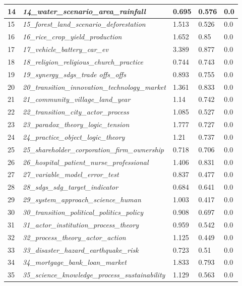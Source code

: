 \documentclass[12pt]{article}
\begin{document}
\begin{longtable}{|l|l|l|l|l|}
14 & \textit{14\_water\_scenario\_area\_rainfall} & 0.695 & 0.576 & 0.0 \\ \hline
15 & \textit{15\_forest\_land\_scenario\_deforestation} & 1.513 & 0.526 & 0.0 \\ \hline
16 & \textit{16\_rice\_crop\_yield\_production} & 1.652 & 0.85 & 0.0 \\ \hline
17 & \textit{17\_vehicle\_battery\_car\_ev} & 3.389 & 0.877 & 0.0 \\ \hline
18 & \textit{18\_religion\_religious\_church\_practice} & 0.744 & 0.743 & 0.0 \\ \hline
19 & \textit{19\_synergy\_sdgs\_trade offs\_offs} & 0.893 & 0.755 & 0.0 \\ \hline
20 & \textit{20\_transition\_innovation\_technology\_market} & 1.361 & 0.833 & 0.0 \\ \hline
21 & \textit{21\_community\_village\_land\_year} & 1.14 & 0.742 & 0.0 \\ \hline
22 & \textit{22\_transition\_city\_actor\_process} & 1.085 & 0.527 & 0.0 \\ \hline
23 & \textit{23\_paradox\_theory\_logic\_tension} & 1.777 & 0.727 & 0.0 \\ \hline
24 & \textit{24\_practice\_object\_logic\_theory} & 1.21 & 0.737 & 0.0 \\ \hline
25 & \textit{25\_shareholder\_corporation\_firm\_ownership} & 0.718 & 0.706 & 0.0 \\ \hline
26 & \textit{26\_hospital\_patient\_nurse\_professional} & 1.406 & 0.831 & 0.0 \\ \hline
27 & \textit{27\_variable\_model\_error\_test} & 0.837 & 0.477 & 0.0 \\ \hline
28 & \textit{28\_sdgs\_sdg\_target\_indicator} & 0.684 & 0.641 & 0.0 \\ \hline
29 & \textit{29\_system\_approach\_science\_human} & 1.003 & 0.417 & 0.0 \\ \hline
30 & \textit{30\_transition\_political\_politics\_policy} & 0.908 & 0.697 & 0.0 \\ \hline
31 & \textit{31\_actor\_institution\_process\_theory} & 0.959 & 0.542 & 0.0 \\ \hline
32 & \textit{32\_process\_theory\_actor\_action} & 1.125 & 0.449 & 0.0 \\ \hline
33 & \textit{33\_disaster\_hazard\_earthquake\_risk} & 0.723 & 0.51 & 0.0 \\ \hline
34 & \textit{34\_mortgage\_bank\_loan\_market} & 1.833 & 0.793 & 0.0 \\ \hline
35 & \textit{35\_science\_knowledge\_process\_sustainability} & 1.129 & 0.563 & 0.0 \\ \hline

\end{longtable}
\end{document}

